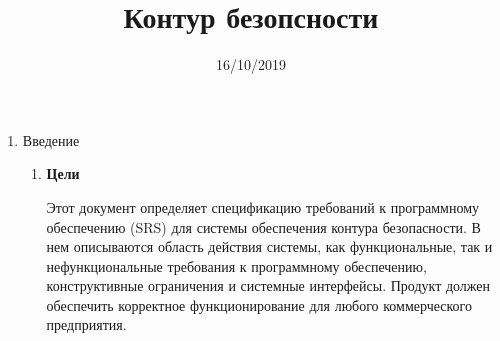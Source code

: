 \documentclass[12pt]{article} %
\title{Контур безопсности} %
\date{16/10/2019} %
\begin{document}
 \maketitle

   \begin{enumerate}

  \item Введение
    \begin{enumerate} 
        \item \begin{large} \textbf{Цели} \end{large} \newline
          Этот документ определяет спецификацию требований к программному обеспечению (SRS) для системы обеспечения контура безопасности. В нем описываются область действия системы, как функциональные, так и нефункциональные требования к программному обеспечению, конструктивные ограничения и системные интерфейсы.
          Продукт должен обеспечить корректное функционирование для любого коммерческого предприятия.


\end{enumerate}
\end{enumerate}
\end{document}

